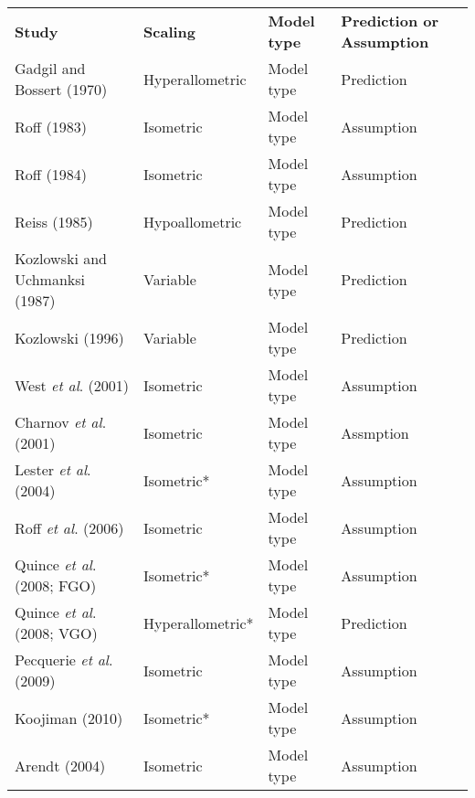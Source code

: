 \documentclass[11pt]{article}
\begin{document}
\begin{table}[]
    \begin{tabular}{llll}
    \textbf{Study}                      & \textbf{Scaling} & \textbf{Model type}    & \textbf{Prediction or Assumption} \\
    Gadgil and Bossert (1970)           & Hyperallometric  & Model type             & Prediction                        \\
    Roff (1983)                         & Isometric        & Model type             & Assumption                        \\
    Roff (1984)                         & Isometric        & Model type             & Assumption                        \\
    Reiss (1985)                        & Hypoallometric   & Model type             & Prediction                        \\
    Kozlowski and Uchmanksi (1987)      & Variable         & Model type             & Prediction                        \\
    Kozlowski (1996)                    & Variable         & Model type             & Prediction                        \\
    West \textit{et al}. (2001)         & Isometric        & Model type             & Assumption                        \\
    Charnov \textit{et al}. (2001)      & Isometric        & Model type             & Assmption                         \\
    Lester \textit{et al}. (2004)       & Isometric*       & Model type             & Assumption                        \\
    Roff \textit{et al}. (2006)         & Isometric        & Model type             & Assumption                        \\
    Quince \textit{et al}. (2008; FGO)  & Isometric*       & Model type             & Assumption                        \\
    Quince \textit{et al}. (2008; VGO)  & Hyperallometric* & Model type             & Prediction                        \\
    Pecquerie \textit{et al}. (2009)    & Isometric        & Model type             & Assumption                        \\
    Koojiman (2010)                     & Isometric*       & Model type             & Assumption                        \\
    Arendt (2004)                       & Isometric        & Model type             & Assumption                        \\

\end{tabular}
\end{table}
\end{document}
